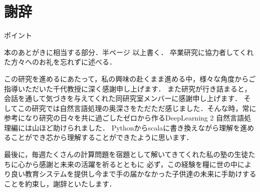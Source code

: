 \documentclass[a4j,11pt,report]{jsbook}
\newcommand{\point}[1]{
\begin{itembox}[l]{ポイント}
  #1
\end{itembox}
}
\begin{document}















\chapter*{謝辞 \label{ch:acknowledgement}}
\thispagestyle{empty}
\if
\point{
本のあとがきに相当する部分．半ページ 以上書く．
卒業研究に協力者してくれた方々へのお礼を忘れずに述べる．
}
\fi
この研究を進めるにあたって，私の興味の赴くまま進める中，様々な角度からご指導いただいた千代教授に深く感謝申し上げます．
また研究が行き詰まると，会話を通して気づきを与えてくれた同研究室メンバーに感謝申し上げます．
そしてこの研究では自然言語処理の奥深さをただただ感じました．そんな時，常に参考になり研究の日々を共に過ごしたゼロから作るDeepLearning 2 自然言語処理編\cite{ZeroDeep}には山ほど助けられました．
Pythonからscalaに書き換えながら理解を進めることができ芯から理解することができたように思います．

最後に，毎週たくさんの計算問題を宿題として解いてきてくれた私の塾の生徒たちに心から感謝と未来の活躍を祈るとともに
必ず，この経験を糧に世の中により良い教育システムを提供し今まで手の届かなかった子供達の未来に手助けすることを約束し，謝辞といたします．
\end{document}
